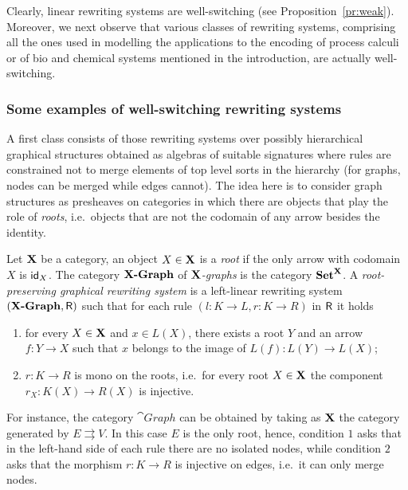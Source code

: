 Clearly, linear rewriting systems are well-switching (see Proposition~\ref{pr:weak}).
Moreover, we next observe that various classes of rewriting systems,
comprising all the ones used in modelling the applications to the
encoding of process calculi or of bio and chemical systems mentioned
in the introduction, are actually well-switching.

\subsubsection{Some examples of well-switching rewriting systems}

A first class consists of those rewriting systems over
possibly hierarchical graphical structures obtained as algebras of
suitable signatures where rules are constrained not to merge elements
of top level sorts in the hierarchy (for graphs, nodes can be
merged while edges cannot). The idea here is to consider graph
structures as presheaves on categories in which there are objects that play 
the role of \emph{roots}, i.e.~objects that are not the codomain of 
any arrow besides the identity. 

\begin{definition}
	Let $\textbf {\textup{X}}$ be a category, an object $X\in \textbf {\textup{X}}$ is a \emph{root} if the only arrow with codomain $X$ is $\mathsf{id}_{X}$.
	The category $\textbf{\textup{{X}-Graph}}$ of \emph{$\textbf {\textup{X}}$-graphs} is the category
	$\textbf {\textup{Set}}^{\textbf {\textup{X}}}$. A
	\emph{root-preserving graphical rewriting system} is a left-linear
	rewriting system $(\textbf{\textup{{X}-Graph}}, \mathsf{R})$ such that for each rule
	$(l\colon K\to L, r\colon K\to R)$ in $\mathsf{R}$ it holds
	\begin{enumerate}
		\item for every $X\in \textbf {\textup{X}}$ and $x\in L(X)$, there exists a root $Y$
		and an arrow $f\colon Y\to X$ such that $x$ belongs to the image of
		$L(f)\colon L(Y)\to L(X)$;
		\item $r\colon K\to R$ is mono on the roots, i.e.~for every root $X\in \textbf {\textup{X}}$ the component $r_X:K(X)\to R(X)$ is injective.
	\end{enumerate}
\end{definition}

For instance, the category $\cat{Graph}$ can be obtained
by taking as $\textbf {\textup{X}}$ the category generated by $E \rightrightarrows V$. In this case $E$ is the only root, hence, condition $1$ asks that in the left-hand side of each rule
there are no isolated nodes, while condition $2$ asks that the
morphism $r: K \to R$ is injective on edges, i.e.~it can only merge nodes.

